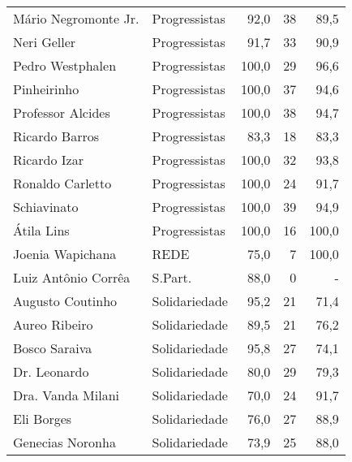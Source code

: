 \begin{longtable}{llrrr}
                Mário Negromonte Jr. &  Progressistas &      92,0 &           38 &       89,5 \\
                         Neri Geller &  Progressistas &      91,7 &           33 &       90,9 \\
                    Pedro Westphalen &  Progressistas &     100,0 &           29 &       96,6 \\
                         Pinheirinho &  Progressistas &     100,0 &           37 &       94,6 \\
                   Professor Alcides &  Progressistas &     100,0 &           38 &       94,7 \\
                      Ricardo Barros &  Progressistas &      83,3 &           18 &       83,3 \\
                        Ricardo Izar &  Progressistas &     100,0 &           32 &       93,8 \\
                    Ronaldo Carletto &  Progressistas &     100,0 &           24 &       91,7 \\
                         Schiavinato &  Progressistas &     100,0 &           39 &       94,9 \\
                          Átila Lins &  Progressistas &     100,0 &           16 &      100,0 \\
                    Joenia Wapichana &           REDE &      75,0 &            7 &      100,0 \\
                 Luiz Antônio Corrêa &        S.Part. &      88,0 &            0 &          - \\
                    Augusto Coutinho &  Solidariedade &      95,2 &           21 &       71,4 \\
                       Aureo Ribeiro &  Solidariedade &      89,5 &           21 &       76,2 \\
                       Bosco Saraiva &  Solidariedade &      95,8 &           27 &       74,1 \\
                        Dr. Leonardo &  Solidariedade &      80,0 &           29 &       79,3 \\
                   Dra. Vanda Milani &  Solidariedade &      70,0 &           24 &       91,7 \\
                          Eli Borges &  Solidariedade &      76,0 &           27 &       88,9 \\
                    Genecias Noronha &  Solidariedade &      73,9 &           25 &       88,0 \\

\end{longtable}
